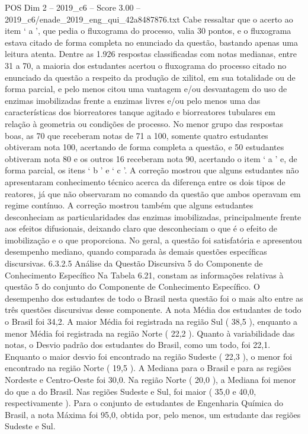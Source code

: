 \begin{textsample}{POS Dim 2 – 2019\_c6 – Score 3.00 – 2019\_c6/enade\_2019\_eng\_qui\_42a8487876.txt}
Cabe ressaltar que o acerto ao item ‘ a ’, que pedia o fluxograma do processo, valia 30 pontos, e o fluxograma estava citado de forma completa no enunciado da questão, bastando apenas uma leitura atenta.
Dentre as 1.926 respostas classificadas com notas medianas, entre 31 a 70, a maioria dos estudantes acertou o fluxograma do processo citado no enunciado da questão a respeito da produção de xilitol, em sua totalidade ou de forma parcial, e pelo menos citou uma vantagem e/ou desvantagem do uso de enzimas imobilizadas frente a enzimas livres e/ou pelo menos uma das características dos biorreatores tanque agitado e biorreatores tubulares em relação à geometria ou condições de processo.
No menor grupo das respostas boas, as 70 que receberam notas de 71 a 100, somente quatro estudantes obtiveram nota 100, acertando de forma completa a questão, e 50 estudantes obtiveram nota 80 e os outros 16 receberam nota 90, acertando o item ‘ a ’ e, de forma parcial, os itens ‘ b ’ e ‘ c ’.
A correção mostrou que alguns estudantes não apresentaram conhecimento técnico acerca da diferença entre os dois tipos de reatores, já que não observaram no comando da questão que ambos operavam em regime contínuo.
A correção mostrou também que alguns estudantes desconheciam as particularidades das enzimas imobilizadas, principalmente frente aos efeitos difusionais, deixando claro que desconheciam o que é o efeito de imobilização e o que proporciona.
No geral, a questão foi satisfatória e apresentou desempenho mediano, quando comparada às demais questões específicas discursivas. 6.3.2.5 Análise da Questão Discursiva 5 do Componente de Conhecimento Específico Na Tabela 6.21, constam as informações relativas à questão 5 do conjunto do Componente de Conhecimento Específico.
O desempenho dos estudantes de todo o Brasil nesta questão foi o mais alto entre as três questões discursivas desse componente.
A nota Média dos estudantes de todo o Brasil foi 34,2.
A maior Média foi registrada na região Sul ( 38,5 ), enquanto a menor Média foi registrada na região Norte ( 22,2 ).
Quanto à variabilidade das notas, o Desvio padrão dos estudantes do Brasil, como um todo, foi 22,1.
Enquanto o maior desvio foi encontrado na região Sudeste ( 22,3 ), o menor foi encontrado na região Norte ( 19,5 ).
A Mediana para o Brasil e para as regiões Nordeste e Centro-Oeste foi 30,0.
Na região Norte ( 20,0 ), a Mediana foi menor do que a do Brasil.
Nas regiões Sudeste e Sul, foi maior ( 35,0 e 40,0, respectivamente ).
Para o conjunto de estudantes de Engenharia Química do Brasil, a nota Máxima foi 95,0, obtida por, pelo menos, um estudante das regiões Sudeste e Sul.

\end{textsample}
